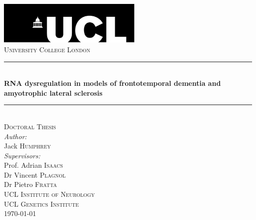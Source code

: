 
\begin{titlepage}%
\newcommand{\HRule}{\rule{\linewidth}{0.5mm}}

\center 

\includegraphics[width=7cm]{Figures/misc/ucllogo.jpg}\\[1cm]
\textsc{\LARGE University College London}\\[2cm] %
\HRule \\[1cm]
{ \huge \bfseries RNA dysregulation in models of frontotemporal dementia and amyotrophic lateral sclerosis}\\[0.4cm] 
\HRule \\[1.5cm]


\textsc{\Large Doctoral Thesis}\\[1.5cm] %


\emph{Author:}\\
Jack \textsc{Humphrey}\\[1cm] %

\emph{Supervisors:} \\
Prof. Adrian \textsc{Isaacs}\\ 
Dr Vincent \textsc{Plagnol}\\ 
Dr Pietro \textsc{Fratta}\\[1cm]


\textsc{\Large UCL Institute of Neurology}\\[0.5cm] %
\textsc{\Large UCL Genetics Institute}\\[2cm] %



{\large \today}\\[3cm] 

\vfill %

\end{titlepage}%
\cleardoublepage

